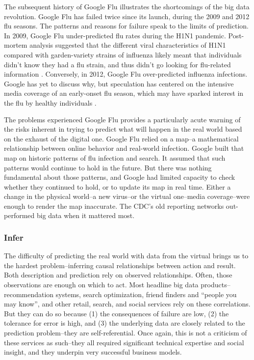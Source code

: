 \documentclass[12pt]{article}
\begin{document}
The subsequent history of Google Flu illustrates the shortcomings of
the big data revolution. Google Flu has failed twice since its launch,
during the 2009 and 2012 flu seasons. The patterns and reasons for
failure speak to the limits of prediction. In 2009, Google Flu
under-predicted flu rates during the H1N1 pandemic. Post-mortem
analysis suggested that the different viral characteristics of H1N1
compared with garden-variety strains of influenza likely meant that
individuals didn't know they had a flu strain, and thus didn't go
looking for flu-related information
\citep{cook2011assessing}. Conversely, in 2012, Google Flu
over-predicted influenza infections. Google has yet to discuss why,
but speculation has centered on the intensive media coverage of an
early-onset flu season, which may have sparked interest in the flu by
healthy individuals \citep{butler2013google}.

The problems experienced Google Flu provides a particularly acute
warning of the risks inherent in trying to predict what will happen in
the real world based on the exhaust of the digital one. Google Flu
relied on a map--a mathematical relationship between online behavior
and real-world infection. Google built that map on historic patterns
of flu infection and search. It assumed that such patterns would
continue to hold in the future. But there was nothing fundamental
about those patterns, and Google had limited capacity to check whether
they continued to hold, or to update its map in real time. Either a change in
the physical world--a new virus--or the virtual one--media
coverage--were enough to render the map inaccurate. The CDC's old
reporting networks out-performed big data when it mattered most.

\subsubsection{Infer}
\label{sec:infer}

The difficulty of predicting the real world with data from the virtual
brings us to the hardest problem--inferring causal relationships
between action and result. Both description and prediction rely on
observed relationships. Often, those observations are enough on which
to act. Most headline big data products--recommendation systems, search
optimization, friend finders and ``people you may know'', and other
retail, search, and social services rely on these correlations. But
they can do so because (1) the consequences of failure are low, (2)
the tolerance for error is high, and (3) the underlying data are
closely related to the prediction problem--they are
self-referential. Once again, this is not a criticism of these
services as such--they all required significant technical expertise
and social insight, and they underpin very successful business models. 
\end{document}
